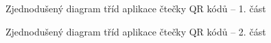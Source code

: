  \begin{figure}[H]
  \begin{center}
    \caption{Zjednodušený diagram tříd aplikace čtečky QR kódů -- 1. část}
    \label{application_uml_1}
  \end{center}
\end{figure}

 \begin{figure}[H]
  \begin{center}
    \caption{Zjednodušený diagram tříd aplikace čtečky QR kódů -- 2. část}
    \label{application_uml_1}
  \end{center}
\end{figure}

